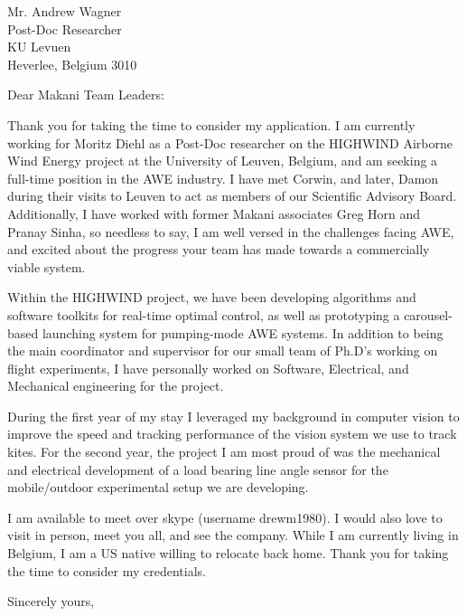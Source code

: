 \documentclass[11pt]{letter} %
\begin{document}
\signature{Andrew Wagner}                  %
\longindentation=0pt                       %
\let\raggedleft\raggedright                %
 
\begin{letter}{Mr. Andrew Wagner \\
Post-Doc Researcher \\
KU Levuen \\
Heverlee, Belgium 3010} 

\vfill %

\opening{Dear Makani Team Leaders:} 
 
\noindent Thank you for taking the time to consider my application.  I am currently working for Moritz Diehl as a Post-Doc researcher on the
HIGHWIND Airborne Wind Energy project at the University of Leuven, Belgium, and
am seeking a full-time position in the AWE industry. I have met Corwin, and
later, Damon during their visits to Leuven to act as members of our Scientific
Advisory Board. Additionally, I have worked with former Makani associates Greg
Horn and Pranay Sinha, so needless to say, I am well versed in the challenges
facing AWE, and excited about the progress your team has made towards a
commercially viable system.  

\noindent Within the HIGHWIND project, we have been developing algorithms and
software toolkits for real-time optimal control, as well as prototyping a
carousel-based launching system for pumping-mode AWE systems. 
In addition to being the main coordinator and supervisor for
our small team of Ph.D's working on flight experiments, I have personally
worked on Software, Electrical, and Mechanical engineering for the project.  

During the first year of my stay I 
leveraged my background in computer vision to improve the speed and tracking
performance of the vision system we use to track kites.  For the second year,
the project I am most proud of was the mechanical and electrical development of
a load bearing line angle sensor for the mobile/outdoor experimental setup we
are developing.  

\noindent I am available to meet over skype (username drewm1980).  I would also
love to visit in person, meet you all, and see the company.  While I am
currently living in Belgium, I am a US native willing to relocate back home.
Thank you for taking the time to consider my credentials.
 
\closing{Sincerely yours,}
 
\encl{}

\end{letter}
 
\end{document}
